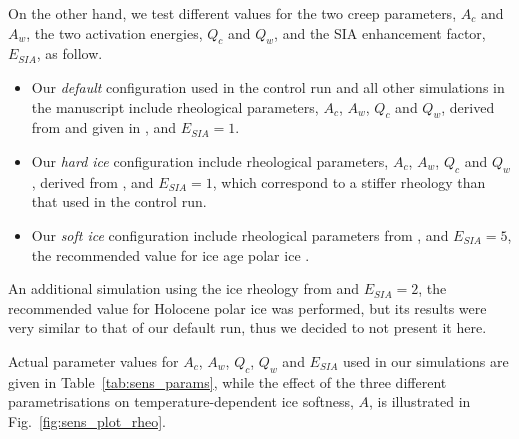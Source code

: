 On the other hand, we test different values for the two creep parameters, $A_c$
and $A_w$, the two activation energies, $Q_c$ and $Q_w$, and the SIA
enhancement factor, $E_{SIA}$, as follow.

\begin{itemize}
    \item{Our \emph{default} configuration used in the control run and all other
          simulations in the manuscript include rheological parameters, $A_c$,
          $A_w$, $Q_c$ and $Q_w$, derived from \citet{Paterson.Budd.1982} and
          given in \citet[Eqn.~5]{Bueler.Brown.2009}, and $E_{SIA}=1$.}
    \item{Our \emph{hard ice} configuration include rheological parameters,
          $A_c$, $A_w$, $Q_c$ and $Q_w$, derived from
          \citet[p.~72 and 76]{Cuffey.Paterson.2010}, and $E_{SIA}=1$, which
          correspond to a stiffer rheology than that used in the control run.}
    \item{Our \emph{soft ice} configuration include rheological parameters
          from \citet{Cuffey.Paterson.2010}, and $E_{SIA}=5$, the
          recommended value for ice age polar ice
          \citep[p.~77]{Cuffey.Paterson.2010}.}
\end{itemize}

An additional simulation using the ice rheology from
\citet{Cuffey.Paterson.2010} and $E_{SIA}=2$, the
recommended value for Holocene polar ice \citep[p.~77]{Cuffey.Paterson.2010}
was performed, but its results were very similar to that of our default run,
thus we decided to not present it here.

Actual parameter values for $A_c$, $A_w$, $Q_c$, $Q_w$ and $E_{SIA}$ used in
our simulations are given in Table~\ref{tab:sens_params}, while the effect of
the three different parametrisations on temperature-dependent ice softness,
$A$, is illustrated in Fig.~\ref{fig:sens_plot_rheo}.


